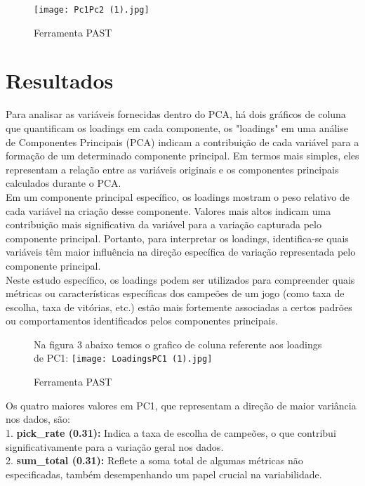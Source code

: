\documentclass[a4paper,12pt]{article}
\begin{document}
\begin{figure}[h]
    \centering
    \texttt{[image: Pc1Pc2 (1).jpg]}
    \caption{Ferramenta PAST}
    \label{fig:enter-label}
\end{figure}


\pagebreak
\section{Resultados}
Para analisar as variáveis fornecidas dentro do PCA, há dois gráficos de coluna que quantificam os loadings em cada componente, os "loadings" em uma análise de Componentes Principais (PCA) indicam a contribuição de cada variável para a formação de um determinado componente principal. Em termos mais simples, eles representam a relação entre as variáveis originais e os componentes principais calculados durante o PCA.\\
Em um componente principal específico, os loadings mostram o peso relativo de cada variável na criação desse componente. Valores mais altos indicam uma contribuição mais significativa da variável para a variação capturada pelo componente principal. Portanto, para interpretar os loadings, identifica-se quais variáveis têm maior influência na direção específica de variação representada pelo componente principal.\\
Neste estudo específico, os loadings podem ser utilizados para compreender quais métricas ou características específicas dos campeões de um jogo (como taxa de escolha, taxa de vitórias, etc.) estão mais fortemente associadas a certos padrões ou comportamentos identificados pelos componentes principais.\\

\begin{figure}[h]
Na figura 3 abaixo temos o grafico de coluna referente aos loadings de PC1:
    \centering
    \texttt{[image: LoadingsPC1 (1).jpg]}
    \caption{Ferramenta PAST}
    \label{fig:enter-label}
\end{figure}
\pagebreak
Os quatro maiores valores em PC1, que representam a direção de maior variância nos dados, são:\\

1. \textbf{pick\_rate (0.31):} Indica a taxa de escolha de campeões, o que contribui significativamente para a variação geral nos dados.\\

2. \textbf{sum\_total (0.31):} Reflete a soma total de algumas métricas não especificadas, também desempenhando um papel crucial na variabilidade.\\
\end{document}
